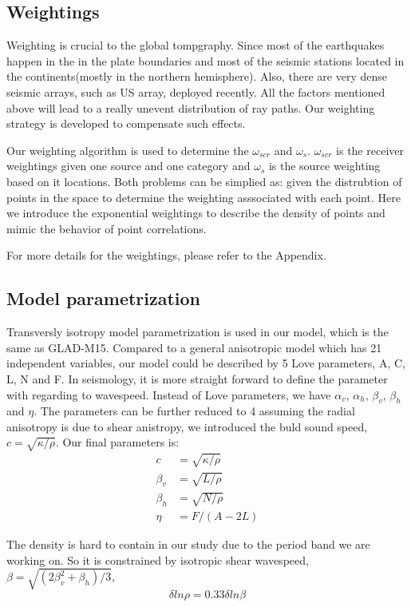 \documentclass[extra,mreferee]{gji}
\begin{document}
\subsection{Weightings}
Weighting is crucial to the global tompgraphy. Since most of the earthquakes happen in the in the plate boundaries and most of the seismic stations located in the continents(mostly in the northern hemisphere). Also, there are very dense seismic arrays, such as US array, deployed recently. All the factors mentioned above will lead to a really unevent distribution of ray paths. Our weighting strategy is developed to compensate such effects.

Our weighting algorithm is used to determine the $\omega_{scr}$ and $\omega_s$. $\omega_{scr}$ is the receiver weightings given one source and one category and $\omega_s$ is the source weighting based on it locations. Both problems can be simplied as: given the distrubtion of points in the space to determine the weighting asssociated with each point. Here we introduce the exponential weightings to describe the density of points and mimic the behavior of point correlations.

For more details for the weightings, please refer to the Appendix.

\subsection{Model parametrization}

Transversly isotropy model parametrization is used in our model, which is the same as GLAD-M15. Compared to a general anisotropic model which has 21 independent variables, our model could be described by 5 Love parameters,  A, C, L, N and F. In seismology, it is more straight forward to define the parameter with regarding to wavespeed. Instead of Love parameters, we have $\alpha_v$, $\alpha_h$, $\beta_v$, $\beta_h$ and $\eta$. The parameters can be further reduced to 4 assuming the radial anisotropy is due to shear anistropy, we introduced the buld sound speed, $c=\sqrt{\kappa/\rho}$. Our final parameters is:\\
\begin{align*}
c &= \sqrt{\kappa/\rho} \\
\beta_v &= \sqrt{L/\rho} \\
\beta_h &= \sqrt{N/\rho} \\
\eta & = F/(A-2L)
\end{align*}

The density is hard to contain in our study due to the period band we are working on. So it is constrained by isotropic shear wavespeed, $\beta = \sqrt{(2\beta_v^2 + \beta_h)/3}$,\\
\begin{equation*}
    \delta ln\rho = 0.33\delta ln\beta
\end{equation*}
\end{document}
